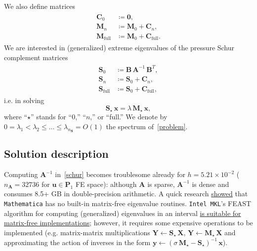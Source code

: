 \documentclass[12pt]{article}
\newcommand{\vect}[1]{\boldsymbol{\mathbf{#1}}}
\begin{document}
We also define matrices 
\begin{align}\begin{split}
	\vect C_0 &\coloneqq \vect 0,\\
	\vect M_n &\coloneqq \vect M_0 + \vect C_n,\\
	\vect M_{\text{full}} &\coloneqq \vect M_0 + \vect C_{\text{full}}.
\end{split}\end{align}
We are interested in (generalized) extreme eigenvalues of the pressure Schur complement matrices
\begin{align}\label{schur}\begin{split}
	\vect S_0 &\coloneqq \vect B\,\vect A^{-1}\,\vect B^{T},\\
	\vect S_n &\coloneqq \vect S_0 + \vect C_n,\\
	\vect S_{\text{full}} &\coloneqq \vect S_0 + \vect C_{\text{full}},
\end{split}\end{align}
i.e. in solving
\begin{equation}\label{problem}
	\vect S_\star\,\vect x = \lambda\,\vect M_\star\,\vect x,
\end{equation}
where ``$\star$'' stands for ``$0$,'' ``$n$,'' or ``full.'' We denote by~$0 = \lambda_1 < \lambda_2 \le \dots \le \lambda_{n_{\vect S}} = O(1)$ the spectrum of~\eqref{problem}.

\subsection{Solution description}

Computing $\vect A^{-1}$ in~\eqref{schur} becomes troublesome already for $h = 5.21\times10^{-2}$ ($n_{\vect A} = 32736$ for $\vect u \in \vect P_1$ FE space): although $\vect A$ is sparse, $\vect A^{-1}$ is dense and consumes 8.5+ GB in double-precision arithmetic. A quick research \href{https://mathematica.stackexchange.com/questions/189620/matrix-free-arnoldi-method-for-eigensystems}{showed} that \texttt{Mathematica} has no built-in matrix-free eigenvalue routines. \texttt{Intel MKL}'s FEAST algorithm for computing (generalized) eigenvalues in an interval \href{https://software.intel.com/sites/default/files/mkl-2019-developer-reference-c.pdf#_OPENTOPIC_TOC_PROCESSING_d62e853651}{is suitable for matrix-free implementations}; however, it requires some expensive operations to be implemented (e.g. matrix-matrix multiplications $\vect Y \leftarrow \vect S_\star\,\vect X$, $\vect Y \leftarrow \vect M_\star\,\vect X$ and approximating the action of inverses in the form $\vect y \leftarrow (\sigma\,\vect M_\star - \vect S_\star)^{-1}\,\vect x$).
\end{document}
